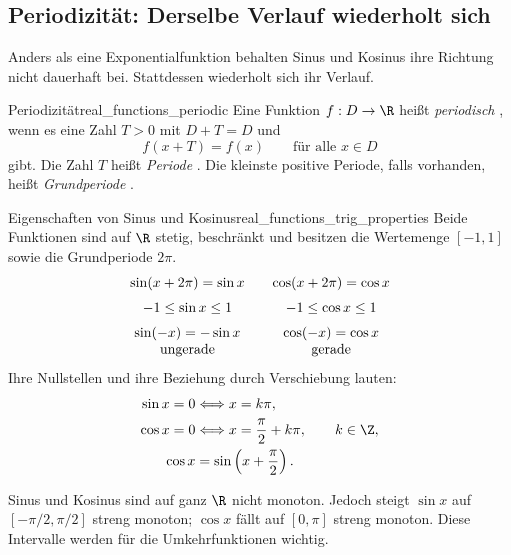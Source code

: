 \clearpage
\subsection{Periodizität: Derselbe Verlauf wiederholt sich}
\label{subsec:real_functions_periodicity}
Anders als eine Exponentialfunktion behalten Sinus und Kosinus ihre
Richtung nicht dauerhaft bei. Stattdessen wiederholt sich ihr Verlauf.
\begin{FunctionPropertyBox}{Periodizität}{real_functions_periodic}
  Eine Funktion $f:D\to\R$ heißt \emph{periodisch}
  , wenn es eine Zahl $T>0$ mit $D+T=D$ und
  \[
    f(x+T)=f(x)\qquad\text{für alle }x\in D
  \]
  gibt. Die Zahl $T$ heißt \emph{Periode} .
  Die kleinste positive Periode, falls vorhanden, heißt
  \emph{Grundperiode} .
\end{FunctionPropertyBox}
\begin{center}
\end{center}
\begin{TheoremBox}{Eigenschaften von Sinus und Kosinus}{real_functions_trig_properties}
  Beide Funktionen sind auf $\R$ stetig, beschränkt und besitzen die
  \textcolor{green!55!black}{Wertemenge} $[-1,1]$ sowie die Grundperiode $2\pi$.
  \[
    \begin{array}{c@{\qquad}c}
      \sin(x+2\pi)=\sin x&\cos(x+2\pi)=\cos x\\[0.6em]
      -1\le\sin x\le1&-1\le\cos x\le1\\[0.6em]
      \sin(-x)=-\sin x&\cos(-x)=\cos x\\
      \text{ungerade}&\text{gerade}
    \end{array}
  \]
  Ihre Nullstellen und ihre Beziehung durch Verschiebung lauten:
  \[
    \begin{aligned}
      \sin x=0&\Longleftrightarrow x=k\pi,\\
      \cos x=0&\Longleftrightarrow x=\frac\pi2+k\pi,
           \qquad k\in\Z,\\
      \cos x&=\sin\left(x+\frac\pi2\right).
    \end{aligned}
  \]
\end{TheoremBox}
Sinus und Kosinus sind auf ganz $\R$ nicht monoton.
Jedoch steigt $\sin x$ auf $[-\pi/2,\pi/2]$ streng monoton;
$\cos x$ fällt auf $[0,\pi]$ streng monoton.
Diese Intervalle werden für die Umkehrfunktionen wichtig.

